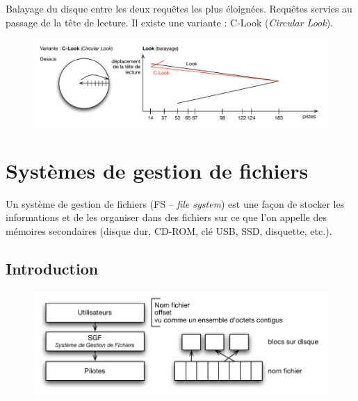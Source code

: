 \documentclass[11pt,english,french]{scrreprt}
\theoremstyle{remark}
\theoremstyle{definition}
\begin{document}
Balayage du disque entre les deux requêtes les plus éloignées. Requêtes servies au passage de la tête de lecture. Il existe une variante : C-Look (\emph{Circular Look}).

\begin{figure}[h!]
	\center
	\vspace{-10pt}
	\includegraphics[scale=.85]{img/C-Look}
\end{figure}


\chapter{Systèmes de gestion de fichiers}

Un système de gestion de fichiers (FS -- \emph{file system}) est une façon de stocker les informations et de les organiser dans des fichiers sur ce que l'on appelle des mémoires secondaires (disque dur, CD-ROM, clé USB, SSD, disquette, etc.).

\section{Introduction}
\begin{figure}[h!]
	\center
	\vspace{-15pt}
	\includegraphics[scale=.85]{img/SGF}
	\vspace{-5pt}
\end{figure}
\end{document}
